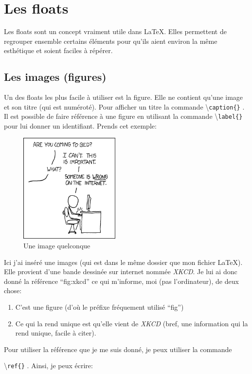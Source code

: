 \documentclass[a4paper, 10pt]{article}
\newcommand{\command}[1]{
  \colorbox{codebackground}{\scriptsize{\textbackslash}\texttt{#1}}
}
\begin{document}
\section{Les floats}

Les floats sont un concept vraiment utile dans \LaTeX. Elles permettent de
regrouper ensemble certains éléments pour qu'ils aient environ la même
esthétique et soient faciles à répérer.

\subsection{Les images (figures)}

Un des floats les plus facile à utiliser est la figure. Elle ne contient
qu'une image et son titre (qui est numéroté). Pour afficher un titre la
commande \command{caption\{\}}. Il est possible de faire référence à une
figure en utilisant la commande \command{label\{\}} pour lui donner un
identifiant. Prends cet exemple:

\begin{figure}[H]
  \begin{center}
    \caption{Une image quelconque}
    \label{fig:xkcd}
    \includegraphics[width=5cm]{image.png}
  \end{center}
\end{figure}

Ici j'ai inséré une images (qui est dans le même dossier que mon fichier
\LaTeX). Elle provient d'une bande dessinée sur internet nommée \textit{XKCD}.
Je lui ai donc donné la référence ``fig:xkcd'' ce qui m'informe, moi (pas
l'ordinateur), de deux chose:

\begin{enumerate}
\item
  C'est une figure (d'où le préfixe fréquement utilisé ``fig'')
\item
  Ce qui la rend unique est qu'elle vient de \textit{XKCD}
  (bref, une information qui la rend unique, facile à citer).
\end{enumerate}
Pour utiliser la référence que je me suis donné, je peux utiliser la commande
\command{ref\{\}}. Ainsi, je peux écrire:
\end{document}
